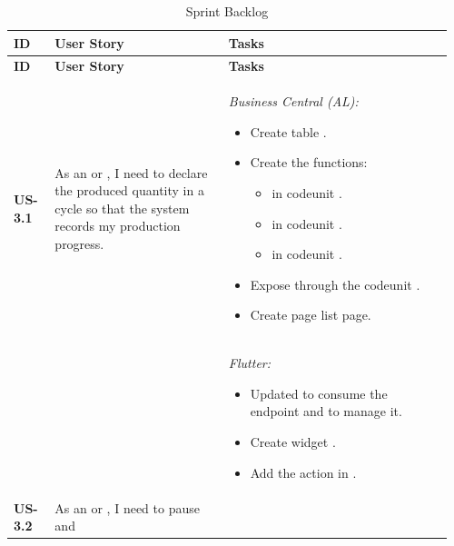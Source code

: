 \begin{longtable}{@{} P{0.09\linewidth} P{0.38\linewidth} P{0.49\linewidth} @{}}
	\caption{Sprint Backlog}
	\label{tab:s3-sprint-backlog} \\
	\toprule
	\textbf{ID} & \textbf{User Story} & \textbf{Tasks} \\
	\midrule
	\endfirsthead
	\toprule
	\textbf{ID} & \textbf{User Story} & \textbf{Tasks} \\
	\midrule
	\endhead
	
	\bottomrule
	\endlastfoot
	
	\textbf{US-3.1}
	& As an  or , I need to declare the
	produced quantity in a cycle so that the system records my
	production progress.
	& \noindent\textit{Business Central (AL):}
	\begin{itemize}[nosep, leftmargin=*]
		\item Create table .
		\item Create the functions:
		\begin{itemize}[nosep, leftmargin=*]
			\item {} in codeunit .
			\item {} in codeunit .
			\item {} in codeunit .
		\end{itemize} 
		\item Expose  through the codeunit .
		\item Create page  list page.
	\end{itemize}
	\\ & &
	\noindent\textit{Flutter:}
	\begin{itemize}[nosep, leftmargin=*]
		\item Updated  to consume the  endpoint and  to manage it.
		\item Create widget .
		\item Add the  action in .
	\end{itemize}\\
	\midrule
	\textbf{US-3.2}
	& As an  or , I need to pause and

\end{longtable}

